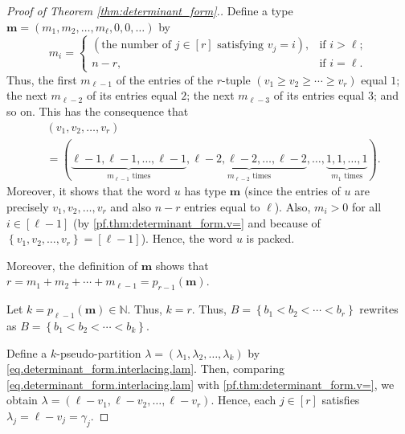 \documentclass[reqno]{amsart}%
\newcommand{\0}{\phantom{c}}
\theoremstyle{plain}
\theoremstyle{definition}
\numberwithin{equation}{section}
\begin{document}
\begin{proof}
[Proof of Theorem \ref{thm:determinant_form}.]Define a type $\mathbf{m}%
=\left(  m_{1},m_{2},\ldots,m_{\ell},0,0,\ldots\right)  $ by
\[
m_{i}=%
\begin{cases}
\left(  \text{the number of }j\in\left[  r\right]  \text{ satisfying }%
v_{j}=i\right)  , & \text{if }i>\ell;\\
n-r, & \text{if }i=\ell.
\end{cases}
\]
Thus, the first $m_{\ell-1}$ of the entries of the $r$-tuple $\left(
v_{1}\geq v_{2}\geq\dotsm\geq v_{r}\right)  $ equal $1$; the next $m_{\ell-2}$
of its entries equal $2$; the next $m_{\ell-3}$ of its entries equal $3$; and
so on. This has the consequence that%
\begin{align}
&  \left(  v_{1},v_{2},\ldots,v_{r}\right) \nonumber\\
&  =\left(  \underbrace{\ell-1,\ell-1,\ldots,\ell-1}_{m_{\ell-1}\text{ times}%
},\underbrace{\ell-2,\ell-2,\ldots,\ell-2}_{m_{\ell-2}\text{ times}}%
,\ldots,\underbrace{1,1,\ldots,1}_{m_{1}\text{ times}}\right)  .
\label{pf.thm:determinant_form.v=}%
\end{align}
Moreover, it shows that the word $u$ has type $\mathbf{m}$ (since the entries
of $u$ are precisely $v_{1},v_{2},\ldots,v_{r}$ and also $n-r$ entries equal
to $\ell$). Also, $m_{i}>0$ for all $i\in\left[  \ell-1\right]  $ (by
\eqref{pf.thm:determinant_form.v=} and because of $\left\{  v_{1},v_{2}%
,\ldots,v_{r}\right\}  =\left[  \ell-1\right]  $). Hence, the word $u$ is packed.

Moreover, the definition of $\mathbf{m}$ shows that $r=m_{1}+m_{2}%
+\cdots+m_{\ell-1}=p_{r-1}\left(  \mathbf{m}\right)  $.

Let $k=p_{\ell-1}\left(  \mathbf{m}\right)  \in\mathbb{N}$. Thus, $k=r$. Thus,
$B=\left\{  b_{1}<b_{2}<\cdots<b_{r}\right\}  $ rewrites as $B=\left\{
b_{1}<b_{2}<\cdots<b_{k}\right\}  $.

Define a $k$-pseudo-partition $\lambda=\left(  \lambda_{1},\lambda_{2}%
,\ldots,\lambda_{k}\right)  $ by \eqref{eq.determinant_form.interlacing.lam}.
Then, comparing \eqref{eq.determinant_form.interlacing.lam} with
\eqref{pf.thm:determinant_form.v=}, we obtain $\lambda=\left(  \ell-v_{1}%
,\ell-v_{2},\ldots,\ell-v_{r}\right)  $. Hence, each $j\in\left[  r\right]  $
satisfies $\lambda_{j}=\ell-v_{j}=\gamma_{j}$.


\end{proof}
\end{document}
